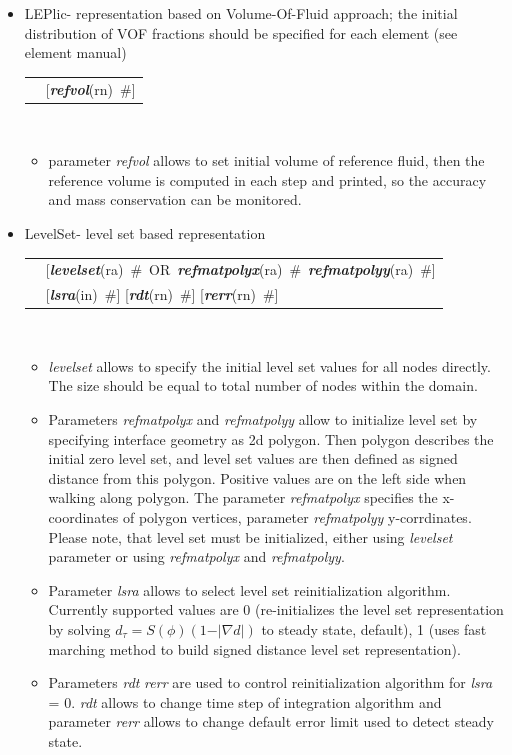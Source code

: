 \documentclass[a4paper]{article}
\makeatletter
\newcommand{\grad}{\nabla}
\newcommand{\param}[1]{{\em #1}}
\newcommand{\keywordnotype}[1]{\mbox{{\it{\bf{#1}}}}}
\newcommand{\keyword}[2]{\mbox{{\keywordnotype{#1}\tiny (#2)}}}
\newcommand{\field}[2]{\mbox{\keyword{#1}{#2}~\#}}
\newcommand{\optField}[2]{\mbox{[\field{#1}{#2}]}}
\newenvironment{record}[1][]{\begin{tabular}{|ll}}{\end{tabular}\\}
\newcommand{\recentry}[2]{{#1}&{#2}\\}
\newcounter{rcc}
\newenvironment{record}[1][\textwidth]{\setcounter{rcc}{0}\begin{tabular*}{#1}{|ll@{\extracolsep{\fill}}r}}{\end{tabular*}\\}
\newcommand{\recentry}[2]{\ifthenelse{\value{rcc}>0}{&$\backslash$ \\}{\setcounter{rcc}{1}}{#1}&{#2}}
\makeatother
\begin{document}
\begin{itemize}
\item LEPlic- representation based on Volume-Of-Fluid approach; the initial distribution of VOF fractions should be specified for each element (see element manual)\\
  \begin{record}[0.9\textwidth]
    \recentry{}{\optField{refvol}{rn}}
  \end{record}
\begin{itemize}
\item
parameter \param{refvol} allows to set initial volume of reference fluid, then the reference volume is computed in each step and printed, so the accuracy and mass conservation can be monitored.
\end{itemize}
\item[]
LevelSet- level set based representation\\
\begin{record}[0.9\textwidth]
\recentry{}{\mbox{[\field{levelset}{ra} OR \field{refmatpolyx}{ra} \field{refmatpolyy}{ra}]}}
\recentry{}{\optField{lsra}{in} \optField{rdt}{rn} \optField{rerr}{rn}}
\end{record}
\begin{itemize}
\item \param{levelset} allows to specify the initial level set values for all nodes directly. The size should be equal to total number of nodes within the domain.
\item Parameters \param{refmatpolyx} and \param{refmatpolyy} allow to initialize level set by specifying interface geometry as 2d polygon. Then polygon describes the initial zero level set, and level set values are then defined as signed distance from this polygon. Positive values are on the left side when walking along polygon. The parameter \param{refmatpolyx} specifies the x-coordinates of polygon vertices, parameter \param{refmatpolyy} y-corrdinates. Please note, that level set must be initialized, either using \param{levelset} parameter or using \param{refmatpolyx} and \param{refmatpolyy}.
\item Parameter \param{lsra} allows to select level set reinitialization algorithm. Currently supported values are 0 (re-initializes the level set representation by solving $d_{\tau} = S(\phi)(1-\vert\grad d\vert)$ to steady state, default), 1 (uses fast  marching method to build signed distance level set representation).
\item Parameters \param{rdt} \param{rerr} are used to control reinitialization algorithm for \param{lsra} = 0. \param{rdt} allows to change time step of integration algorithm and parameter \param{rerr} allows to change default error limit used to detect steady state.
\end{itemize}
\end{itemize}
\end{document}
